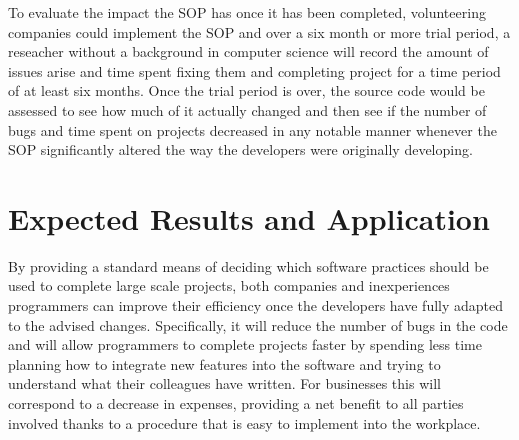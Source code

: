 \documentclass[12pt, letterpaper]{article}
\begin{document}
  To evaluate the impact the SOP has once it has been completed, volunteering companies could implement the SOP and over a six month or more trial period, a reseacher without a background in computer science will record the amount of issues arise and time spent fixing them and completing project for a time period of
  at least six months. Once the trial period is over, the source code would be assessed to see how much of it actually changed and then see if the number of bugs and time spent on projects decreased in any notable manner whenever
  the SOP significantly altered the way the developers were originally developing.
\section{Expected Results and Application}
  By providing a standard means of deciding which software practices should be used to complete large scale projects, both companies and inexperiences programmers can improve their efficiency once
  the developers have fully adapted to the advised changes. Specifically, it will reduce the number of bugs in the code and will allow programmers to complete projects faster by spending less time
  planning how to integrate new features into the software and trying to understand what their colleagues have written. For businesses this will correspond to a decrease in expenses, providing a net
  benefit to all parties involved thanks to a procedure that is easy to implement into the workplace.
\end{document}
